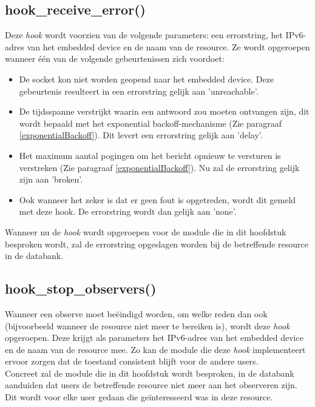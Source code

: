 \subsection{hook\_receive\_error()}
Deze \textit{hook} wordt voorzien van de volgende parameters: een errorstring, het IPv6-adres van het embedded device en de naam van de resource. Ze wordt opgeroepen wanneer \'{e}\'{e}n van de volgende gebeurtenissen zich voordoet:
\begin{itemize}
\item De socket kon niet worden geopend naar het embedded device. Deze gebeurtenis resulteert in een errorstring gelijk aan 'unreachable'.
\item De tijdsspanne verstrijkt waarin een antwoord zou moeten ontvangen zijn, dit wordt bepaald met het exponential backoff-mechanisme (Zie paragraaf \ref{exponentialBackoff}). Dit levert een errorstring gelijk aan 'delay'.
\item Het maximum aantal pogingen om het bericht opnieuw te versturen is verstreken (Zie paragraaf \ref{exponentialBackoff}). Nu zal de errorstring gelijk zijn aan 'broken'.
\item Ook wanneer het zeker is dat er geen fout is opgetreden, wordt dit gemeld met deze hook. De errorstring wordt dan gelijk aan 'none'.
\end{itemize}
Wanneer nu de \textit{hook} wordt opgeroepen voor de module die in dit hoofdstuk besproken wordt, zal de errorstring opgeslagen worden bij de betreffende resource in de databank.

\subsection{hook\_stop\_observers()}
Wanneer een observe moet be\"{e}indigd worden, om welke reden dan ook (bijvoorbeeld wanneer de resource niet meer te bereiken is), wordt deze \textit{hook} opgeroepen. Deze krijgt als parameters het IPv6-adres van het embedded device en de naam van de resource mee. Zo kan de module die deze \textit{hook} implementeert ervoor zorgen dat de toestand consistent blijft voor de andere users.\\
Concreet zal de module die in dit hoofdstuk wordt besproken, in de databank aanduiden dat users de betreffende resource niet meer aan het observeren zijn. Dit wordt voor elke user gedaan die ge\"{i}nteresseerd was in deze resource.